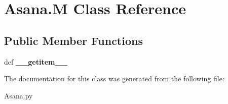 \hypertarget{class_asana_1_1_m}{\section{\-Asana.\-M \-Class \-Reference}
\label{class_asana_1_1_m}
}
\subsection*{\-Public \-Member \-Functions}
\begin{DoxyCompactItemize}
\item 
\hypertarget{class_asana_1_1_m_a469c22b1fab5865fb95f0ed3dce350fe}{def {\bfseries \-\_\-\-\_\-getitem\-\_\-\-\_\-}}\label{class_asana_1_1_m_a469c22b1fab5865fb95f0ed3dce350fe}

\end{DoxyCompactItemize}


\-The documentation for this class was generated from the following file\-:\begin{DoxyCompactItemize}
\item 
\-Asana.\-py\end{DoxyCompactItemize}
